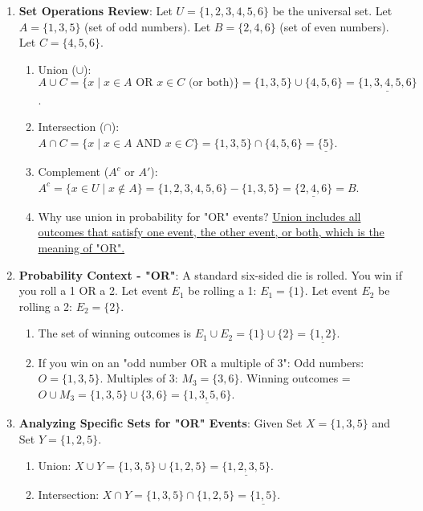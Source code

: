 \documentclass[12pt]{article}
\begin{document}
\begin{enumerate}[label=36.\arabic*]
    \item \textbf{Set Operations Review}:
    Let \( U = \{1, 2, 3, 4, 5, 6\} \) be the universal set.
    Let \( A = \{1, 3, 5\} \) (set of odd numbers).
    Let \( B = \{2, 4, 6\} \) (set of even numbers).
    Let \( C = \{4, 5, 6\} \).
    \begin{enumerate}[label=\alph*)]
        \item Union (\(\cup\)): \( A \cup C = \{x \mid x \in A \text{ OR } x \in C \text{ (or both)}\} = \{1, 3, 5\} \cup \{4, 5, 6\} = \underline{\{1, 3, 4, 5, 6\}} \).
        \item Intersection (\(\cap\)): \( A \cap C = \{x \mid x \in A \text{ AND } x \in C\} = \{1, 3, 5\} \cap \{4, 5, 6\} = \underline{\{5\}} \).
        \item Complement (\(A^c\) or \(A'\)): \( A^c = \{x \in U \mid x \notin A\} = \{1, 2, 3, 4, 5, 6\} - \{1, 3, 5\} = \underline{\{2, 4, 6\}} = B \).
        \item Why use union in probability for "OR" events? \underline{Union includes all outcomes that satisfy one event, the other event, or both, which is the meaning of "OR".}
    \end{enumerate}
    \item \textbf{Probability Context - "OR"}:
    A standard six-sided die is rolled. You win if you roll a 1 OR a 2.
    Let event \(E_1\) be rolling a 1: \( E_1 = \{1\} \).
    Let event \(E_2\) be rolling a 2: \( E_2 = \{2\} \).
    \begin{enumerate}[label=\alph*)]
        \item The set of winning outcomes is \( E_1 \cup E_2 = \{1\} \cup \{2\} = \underline{\{1, 2\}} \).
        \item If you win on an "odd number OR a multiple of 3":
        Odd numbers: \(O = \{1, 3, 5\}\). Multiples of 3: \(M_3 = \{3, 6\}\).
        Winning outcomes = \( O \cup M_3 = \{1, 3, 5\} \cup \{3, 6\} = \underline{\{1, 3, 5, 6\}} \).
    \end{enumerate}
    \item \textbf{Analyzing Specific Sets for "OR" Events}:
    Given Set \(X = \{1, 3, 5\}\) and Set \(Y = \{1, 2, 5\}\).
    \begin{enumerate}[label=\alph*)]
        \item Union: \( X \cup Y = \{1, 3, 5\} \cup \{1, 2, 5\} = \underline{\{1, 2, 3, 5\}} \).
        \item Intersection: \( X \cap Y = \{1, 3, 5\} \cap \{1, 2, 5\} = \underline{\{1, 5\}} \).

\end{enumerate}
\end{enumerate}
\end{document}
